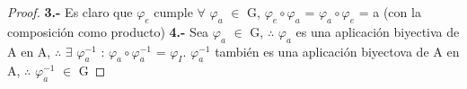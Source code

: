 \documentclass[10pt,a4paper,oneside]{article}
\begin{document}
\begin{proof}
				\newline
				\textbf{3.-}
				Es claro que $\varphi_{e}$ cumple $\forall$ $\varphi_{a}$ $\in$ G, $\varphi_{e}\circ\varphi_{a}$ = $\varphi_{a}\circ\varphi_{e}$ = a (con la composición como producto)
				\newline
				\newline
				\textbf{4.-}
				Sea $\varphi_{a}$ $\in$ G, $\therefore$ $\varphi_{a}$ es una aplicación biyectiva de A en A, $\therefore$ $\exists$ $\varphi_{a}^{-1}$ : $\varphi_{a}\circ\varphi_{a}^{-1}$ = $\varphi_{I}$. $\varphi_{a}^{-1}$ también es una aplicación biyectova de A en A, $\therefore$ $\varphi_{a}^{-1}$ $\in$ G
				\newline

			\end{proof}
\end{document}
